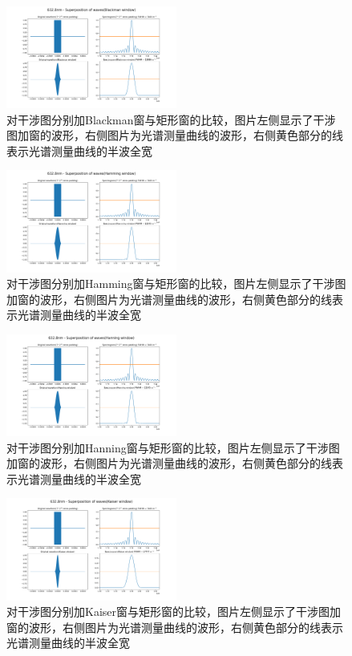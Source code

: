 \documentclass[conference]{IEEEtran}
\begin{document}
\begin{figure}[htbp]
    \centerline{\includegraphics[width=0.5\textwidth]{Blackman.png}}
    \caption{对干涉图分别加Blackman窗与矩形窗的比较，图片左侧显示了干涉图加窗的波形，右侧图片为光谱测量曲线的波形，右侧黄色部分的线表示光谱测量曲线的半波全宽}
    \label{pic14}
\end{figure}

\begin{figure}[htbp]
    \centerline{\includegraphics[width=0.5\textwidth]{hamming.png}}
    \caption{对干涉图分别加Hamming窗与矩形窗的比较，图片左侧显示了干涉图加窗的波形，右侧图片为光谱测量曲线的波形，右侧黄色部分的线表示光谱测量曲线的半波全宽}
    \label{pic15}
\end{figure}

\begin{figure}[htbp]
    \centerline{\includegraphics[width=0.5\textwidth]{Hanning.png}}
    \caption{对干涉图分别加Hanning窗与矩形窗的比较，图片左侧显示了干涉图加窗的波形，右侧图片为光谱测量曲线的波形，右侧黄色部分的线表示光谱测量曲线的半波全宽}
    \label{pic16}
\end{figure}

\begin{figure}[htbp]
    \centerline{\includegraphics[width=0.5\textwidth]{Kaiser.png}}
    \caption{对干涉图分别加Kaiser窗与矩形窗的比较，图片左侧显示了干涉图加窗的波形，右侧图片为光谱测量曲线的波形，右侧黄色部分的线表示光谱测量曲线的半波全宽}
    \label{pic17}
\end{figure}
\end{document}
